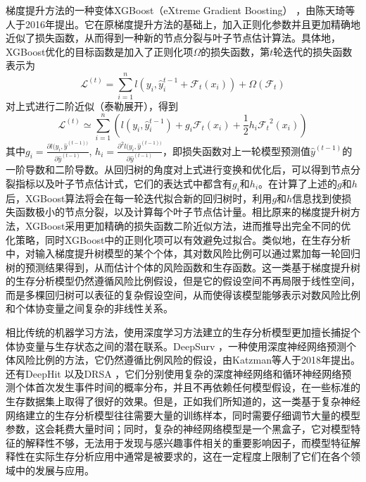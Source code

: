 梯度提升方法的一种变体XGBoost（eXtreme Gradient Boosting） ，由陈天琦等人于2016年提出。它在原梯度提升方法的基础上，加入正则化参数并且更加精确地近似了损失函数，从而得到一种新的节点分裂与叶子节点估计算法。具体地，XGBoost优化的目标函数是加入了正则化项$\Omega$的损失函数，第$t$轮迭代的损失函数表示为 
\begin{equation}
\mathcal{L}^{(t)} = \sum_{i=1}^n l(y_i, \hat{y}_i^{t-1} + \mathcal{F}_t(x_i)) + \Omega(\mathcal{F}_t) \label{F11}
\end{equation}
对上式进行二阶近似（泰勒展开），得到
\begin{equation}
\mathcal{L}^{(t)} \simeq \sum_{i=1}^n \left( l(y_i, \hat{y}_i^{t-1})+g_i\mathcal{F}_t(x_i)+\frac{1}{2} h_i {\mathcal{F}_t}^2 (x_i) \right) \label{F12}
\end{equation}
其中$g_i=\frac{\partial l(y_i, \hat{y}^{(t-1))}}{\partial \hat{y}^{(t-1)}}$, $h_i=\frac{\partial^2 l(y_i, \hat{y}^{(t-1))}}{\partial \hat{y}^{(t-1)}}$，即损失函数对上一轮模型预测值$\hat{y}^{(t-1)}$的一阶导数和二阶导数。从回归树的角度对上式进行变换和优化后，可以得到节点分裂指标以及叶子节点估计式，它们的表达式中都含有$g_i$和$h_i$。在计算了上述的$g$和$h$后，XGBoost算法将会在每一轮迭代拟合新的回归树时，利用$g$和$h$信息找到使损失函数极小的节点分裂，以及计算每个叶子节点估计量。相比原来的梯度提升树方法，XGBoost采用更加精确的损失函数二阶近似方法，进而推导出完全不同的优化策略，同时XGBoost中的正则化项可以有效避免过拟合。类似地，在生存分析中，对输入梯度提升树模型的某个个体，其对数风险比例可以通过累加每一轮回归树的预测结果得到，从而估计个体的风险函数和生存函数。这一类基于梯度提升树的生存分析模型仍然遵循风险比例假设，但是它的假设空间不再局限于线性空间，而是多棵回归树可以表征的复杂假设空间，从而使得该模型能够表示对数风险比例和个体协变量之间复杂的非线性关系。

相比传统的机器学习方法，使用深度学习方法建立的生存分析模型更加擅长捕捉个体协变量与生存状态之间的潜在联系。DeepSurv ，一种使用深度神经网络预测个体风险比例的方法，它仍然遵循比例风险的假设，由Katzman等人于2018年提出。还有DeepHit 以及DRSA ，它们分别使用复杂的深度神经网络和循环神经网络预测个体首次发生事件时间的概率分布，并且不再依赖任何模型假设，在一些标准的生存数据集上取得了很好的效果。但是，正如我们所知道的，这一类基于复杂神经网络建立的生存分析模型往往需要大量的训练样本，同时需要仔细调节大量的模型参数，这会耗费大量时间；同时，复杂的神经网络模型是一个黑盒子，它对模型特征的解释性不够，无法用于发现与感兴趣事件相关的重要影响因子，而模型特征解释性在实际生存分析应用中通常是被要求的，这在一定程度上限制了它们在各个领域中的发展与应用。

